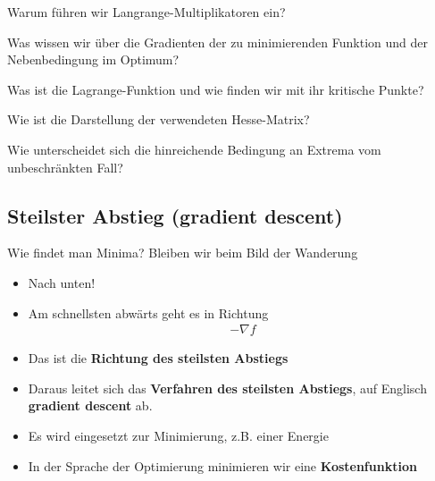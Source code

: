 \begin{Abschluss}
\item Warum führen wir Langrange-Multiplikatoren ein?
\item Was wissen wir über die Gradienten der zu minimierenden
  Funktion und der Nebenbedingung im Optimum?
\item Was ist die Lagrange-Funktion und wie finden wir mit ihr
  kritische Punkte?
\item Wie ist die Darstellung der verwendeten Hesse-Matrix?
\item Wie unterscheidet sich die hinreichende Bedingung an Extrema
  vom unbeschränkten Fall?
\end{Abschluss}


\subsection{Steilster Abstieg (gradient descent)}
\begin{frame}{Wie findet man Minima?}
  Bleiben wir beim Bild der Wanderung
  \pause
  \begin{itemize}
  \item Nach unten!
  \item Am schnellsten abwärts geht es in Richtung
    \begin{gather*}
      -\nabla f
    \end{gather*}
  \item Das ist die \textbf{Richtung des steilsten Abstiegs}
  \item Daraus leitet sich das \textbf{Verfahren des steilsten
      Abstiegs}, auf Englisch \textbf{gradient descent} ab.
  \item Es wird eingesetzt zur Minimierung, z.B. einer Energie
  \item In der Sprache der Optimierung minimieren wir eine
    \textbf{Kostenfunktion}
  \end{itemize}
\end{frame}

